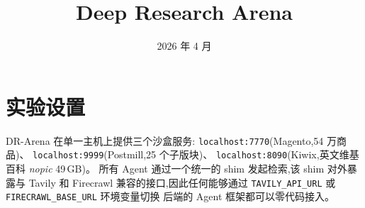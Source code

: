 \documentclass[UTF8,11pt]{ctexart}
\title{Deep Research Arena}
\author{}
\date{2026 年 4 月}
\newcommand{\arena}{DR-Arena}
\begin{document}
\maketitle

\section{实验设置}

\arena{} 在单一主机上提供三个沙盒服务:
\texttt{localhost:7770}(Magento,54 万商品)、
\texttt{localhost:9999}(Postmill,25 个子版块)、
\texttt{localhost:8090}(Kiwix,英文维基百科 \emph{nopic} 49\,GB)。
所有 Agent 通过一个统一的 shim 发起检索,该 shim 对外暴露与 Tavily 和
Firecrawl 兼容的接口,因此任何能够通过
\texttt{TAVILY\_API\_URL} 或 \texttt{FIRECRAWL\_BASE\_URL} 环境变量切换
后端的 Agent 框架都可以零代码接入。
\end{document}
